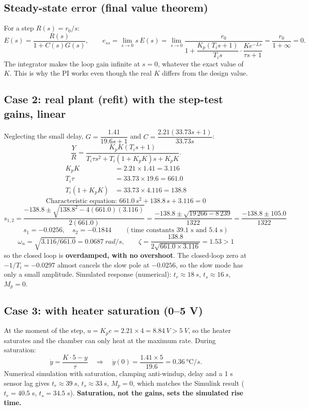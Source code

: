 \documentclass[11pt,a4paper]{article}
\begin{document}
\subsection{Steady-state error (final value theorem)}
For a step $R(s) = r_0/s$:
\[
E(s) = \frac{R(s)}{1 + C(s)G(s)},\qquad
e_{ss} = \lim_{s\to0} s\,E(s) = \lim_{s\to0}\frac{r_0}{1 + \dfrac{K_p(T_i s+1)}{T_i s}\cdot\dfrac{K e^{-Ls}}{\tau s+1}} = \frac{r_0}{1 + \infty} = \boxed{0}.
\]
The integrator makes the loop gain infinite at $s = 0$, whatever the exact value of $K$.
This is why the PI works even though the real $K$ differs from the design value.

\subsection{Case 2: real plant (refit) with the step-test gains, linear}
Neglecting the small delay, $G = \dfrac{1.41}{19.6 s + 1}$ and $C = \dfrac{2.21(33.73 s + 1)}{33.73 s}$:
\[
\frac{Y}{R} = \frac{K_pK(T_i s + 1)}{T_i\tau s^2 + T_i(1 + K_pK)s + K_pK}.
\]
\begin{align*}
K_p K &= 2.21\times1.41 = 3.116\\
T_i\tau &= 33.73\times19.6 = 661.0\\
T_i(1 + K_pK) &= 33.73\times4.116 = 138.8
\end{align*}
\[
\text{Characteristic equation: } 661.0\,s^2 + 138.8\,s + 3.116 = 0
\]
\[
s_{1,2} = \frac{-138.8 \pm\sqrt{138.8^2 - 4(661.0)(3.116)}}{2(661.0)}
= \frac{-138.8 \pm \sqrt{19\,266 - 8\,239}}{1322} = \frac{-138.8 \pm 105.0}{1322}
\]
\[
\boxed{s_1 = -0.0256,\quad s_2 = -0.1844}\qquad(\text{time constants } 39.1\text{ s and } 5.4\text{ s})
\]
\[
\omega_n = \sqrt{3.116/661.0} = \SI{0.0687}{rad\per s},\qquad
\zeta = \frac{138.8}{2\sqrt{661.0\times3.116}} = 1.53 > 1
\]
so the closed loop is \textbf{overdamped, with no overshoot}.
The closed-loop zero at $-1/T_i = -0.0297$ almost cancels the slow pole at $-0.0256$, so the slow
mode has only a small amplitude. Simulated response (numerical): $t_r \approx \SI{18}{s}$,
$t_s \approx \SI{16}{s}$, $M_p = 0$.

\subsection{Case 3: with heater saturation (0--5 V)}
At the moment of the step, $u = K_p e = 2.21\times4 = \SI{8.84}{V} > \SI{5}{V}$, so the heater saturates and
the chamber can only heat at the maximum rate. During saturation:
\[
\dot y = \frac{K\cdot5 - y}{\tau} \quad\Rightarrow\quad \dot y(0) = \frac{1.41\times5}{19.6} = \SI{0.36}{\celsius\per s}.
\]
Numerical simulation with saturation, clamping anti-windup, delay and a 1 s sensor lag gives
$t_r \approx \SI{39}{s}$, $t_s \approx \SI{33}{s}$, $M_p = 0$, which matches the Simulink result
($t_r = 40.5$ s, $t_s = 34.5$ s). \textbf{Saturation, not the gains, sets the simulated rise time.}
\end{document}
